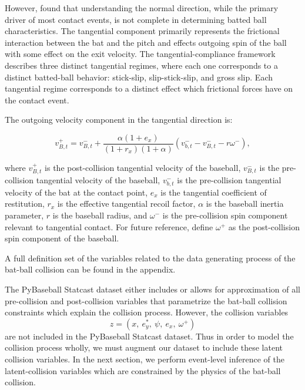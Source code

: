 \documentclass[11pt]{article}
\begin{document}
However, \citet{cross2006scattering} found that understanding the normal direction, while the primary driver of most contact events, is not complete in determining batted ball characteristics. The tangential component primarily represents the frictional interaction between the bat and the pitch and effects outgoing spin of the ball with some effect on the exit velocity. \citet{kensrud2017oblique} The tangential-compliance framework describes three distinct tangential regimes, where each one corresponds to a distinct batted-ball behavior: stick-slip, slip-stick-slip, and gross slip. Each tangential regime corresponds to a distinct effect which frictional forces have on the contact event. 

The outgoing velocity component in the tangential direction is:

\begin{equation}
v_{B,t}^{+}
=
v_{B,t}^{-}
+
\frac{\alpha(1+e_x)}
{(1+r_x)(1+\alpha)}
\left(
v_{b,t}^{-}
-
v_{B,t}^{-}
-
r\omega^{-}
\right),
\label{eq:tangential_velocity}
\end{equation}

where $v_{B,t}^{+}$ is the post-collision tangential velocity of the baseball, $v_{B,t}^{-}$ is the pre-collision tangential velocity of the baseball, $v_{b,t}^{-}$ is the pre-collision tangential velocity of the bat at the contact point, $e_x$ is the tangential coefficient of restitution, $r_x$ is the effective tangential recoil factor, $\alpha$ is the baseball inertia parameter, $r$ is the baseball radius, and $\omega^{-}$ is the pre-collision spin component relevant to tangential contact. For future reference, define $\omega^{+}$ as the post-collision spin component of the baseball. 

A full definition set of the variables related to the data generating process of the bat-ball collision can be found in the appendix.

The PyBaseball Statcast dataset either includes or allows for approximation of all pre-collision and post-collision variables that parametrize the bat-ball collision constraints which explain the collision process. However, the collision variables
\[
z
=
\left(
x,\ e_y^{\ast},\ \psi,\ e_x,\ \omega^{+}
\right)
\]
are not included in the PyBaseball Statcast dataset. Thus in order to model the collision process wholly, we must augment our dataset to include these latent collision variables. In the next section, we perform event-level inference of the latent-collision variables which are constrained by the physics of the bat-ball collision.
\end{document}
